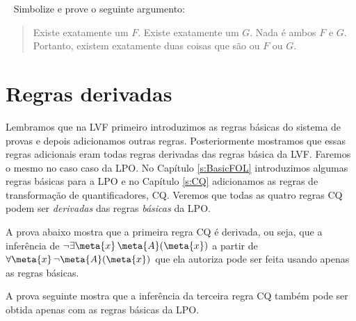 \
\problempart
Simbolize e prove o seguinte argumento:
	\begin{quote}
		Existe exatamente um $F$. Existe exatamente um $G$. Nada é ambos $F$ e $G$. Portanto, existem exatamente duas coisas que  são ou $F$ ou $G$.
	\end{quote}
 




\chapter{Regras derivadas}\label{s:DerivedFOL}
Lembramos que na LVF primeiro introduzimos as regras básicas do sistema de provas e depois adicionamos outras regras.  Posteriormente mostramos que essas regras adicionais eram todas regras derivadas das regras básica da LVF. Faremos o mesmo no caso caso da LPO.  No  Capítulo  \ref{s:BasicFOL} introduzimos algumas regras básicas para a LPO e no Capítulo  \ref{s:CQ} adicionamos  as  regras de transformação de quantificadores, CQ.  Veremos que todas as quatro regras CQ podem ser \emph{derivadas} das regras \emph{básicas} da LPO.  

A prova abaixo mostra que a primeira regra CQ é derivada, ou seja, que a inferência de $\enot\exists \meta{x}\, \atom{\meta{A}}{\meta{x}}$ a partir de $\forall \meta{x}\, \enot \atom{\meta{A}}{\meta{x}}$ que ela autoriza pode ser feita usando apenas as regras básicas.
\begin{fitchproof}
	\open
		\open
		\close
	\close
\end{fitchproof}
A prova seguinte mostra que a inferência da terceira regra CQ também pode ser obtida apenas com as regras básicas da LPO.  
   

